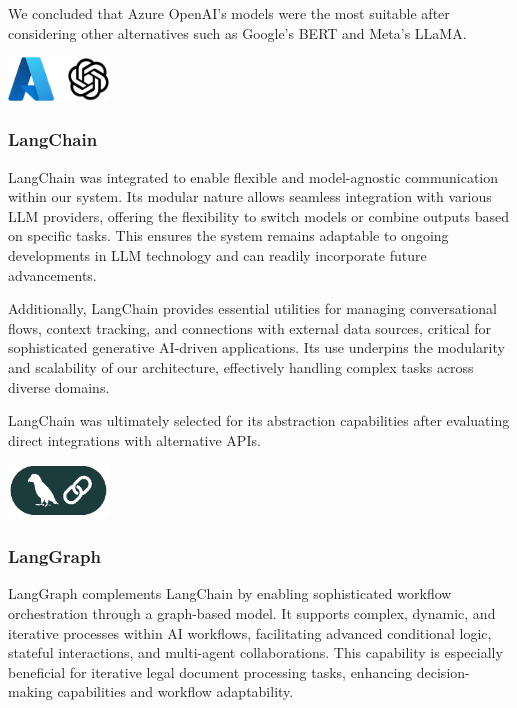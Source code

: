 We concluded that Azure OpenAI's models were the most suitable after considering other alternatives such as Google's BERT and Meta's LLaMA.

\begin{center}
    \centering
    \includegraphics[width=0.2\textwidth]{Images/Azure OpenAI Logo.png}
     \cite{azure_openai_logo}
    \label{fig:azure_openai_logo}
\end{center}

\subsubsection{LangChain}
LangChain was integrated to enable flexible and model-agnostic communication within our system. Its modular nature allows seamless integration with various LLM providers, offering the flexibility to switch models or combine outputs based on specific tasks. This ensures the system remains adaptable to ongoing developments in LLM technology and can readily incorporate future advancements.\mynewline

Additionally, LangChain provides essential utilities for managing conversational flows, context tracking, and connections with external data sources, critical for sophisticated generative AI-driven applications. Its use underpins the modularity and scalability of our architecture, effectively handling complex tasks across diverse domains.\mynewline

LangChain was ultimately selected for its abstraction capabilities after evaluating direct integrations with alternative APIs.

\begin{center}
    \centering
    \includegraphics[width=0.2\textwidth]{Images/LangChain Logo.png}
     \cite{langchain_logo}
    \label{fig:langchain_logo}
\end{center}

\subsubsection{LangGraph}
LangGraph complements LangChain by enabling sophisticated workflow orchestration through a graph-based model. It supports complex, dynamic, and iterative processes within AI workflows, facilitating advanced conditional logic, stateful interactions, and multi-agent collaborations. This capability is especially beneficial for iterative legal document processing tasks, enhancing decision-making capabilities and workflow adaptability.\mynewline

